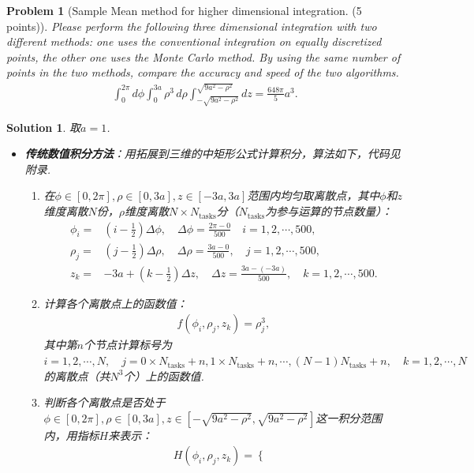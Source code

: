 \documentclass[UTF8,10pt,a4paper]{article}
\theoremstyle{Problem}
\newtheorem{prob}{Problem}
\theoremstyle{Solution}
\newtheorem*{sol}{Solution}
\begin{document}
\begin{prob}[Sample Mean method for higher dimensional integration. (5 points)]
    Please perform the following three dimensional integration with two different methods: one uses the conventional integration on equally discretized points, the other one uses the Monte Carlo method. By using the same number of points in the two methods, compare the accuracy and speed of the two algorithms.
    \begin{align}
        \int_0^{2\pi}d\phi\int_0^{3a}\rho^3\,d\rho\int_{-\sqrt{9a^2-\rho^2}}^{\sqrt{9a^2-\rho^2}}dz=\frac{648\pi}{5}a^3.
    \end{align}
\end{prob}
\begin{sol}
    取$a=1$.
    \begin{itemize}
        \item \textbf{传统数值积分方法}：用拓展到三维的中矩形公式计算积分，算法如下，代码见附录.
        \begin{enumerate}
            \item 在$\phi\in[0,2\pi],\rho\in[0,3a],z\in[-3a,3a]$范围内均匀取离散点，其中$\phi$和$z$维度离散$N$份，$\rho$维度离散$N\times N_{\text{tasks}}$分（$N_{\text{tasks}}$为参与运算的节点数量）：
            \begin{align}
                \phi_i=&\left(i-\frac{1}{2}\right)\Delta\phi,\quad\Delta\phi=\frac{2\pi-0}{500}\quad i=1,2,\cdots,500,\\
                \rho_j=&\left(j-\frac{1}{2}\right)\Delta\rho,\quad\Delta\rho=\frac{3a-0}{500},\quad j=1,2,\cdots,500,\\
                z_k=&-3a+\left(k-\frac{1}{2}\right)\Delta z,\quad\Delta z=\frac{3a-(-3a)}{500},\quad k=1,2,\cdots,500.
            \end{align}
            \item 计算各个离散点上的函数值：
            \begin{align}
                f(\phi_i,\rho_j,z_k)=\rho_j^3,
            \end{align}
            其中第$n$个节点计算标号为$i=1,2,\cdots,N,\quad j=0\times N_{\text{tasks}}+n,1\times N_{\text{tasks}}+n,\cdots,(N-1)N_{\text{tasks}}+n,\quad k=1,2,\cdots,N$的离散点（共$N^3$个）上的函数值.
            \item 判断各个离散点是否处于$\phi\in[0,2\pi],\rho\in[0,3a],z\in[-\sqrt{9a^2-\rho^2},\sqrt{9a^2-\rho^2}]$这一积分范围内，用指标$H$来表示：
            \begin{align}
                H(\phi_i,\rho_j,z_k)=\left\{\begin{array}{ll}

\end{array}
\end{align}
\end{enumerate}
\end{itemize}
\end{sol}
\end{document}
